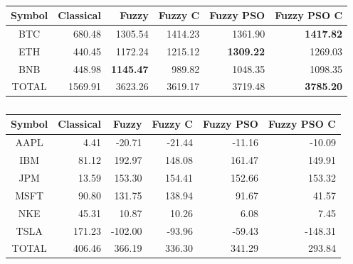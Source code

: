 \begin{table}[]
    \centering
    \begin{tabular}{crrrrr}
        \hline
        \textbf{Symbol} & \textbf{Classical} & \textbf{Fuzzy}                          & \textbf{Fuzzy C} & \textbf{Fuzzy PSO}                      & \textbf{Fuzzy PSO C}                    \\ \hline
        BTC             & 680.48             & 1305.54                                 & 1414.23          & 1361.90                                 & {\color[HTML]{009901} \textbf{1417.82}} \\ \hline
        ETH             & 440.45             & 1172.24                                 & 1215.12          & {\color[HTML]{009901} \textbf{1309.22}} & 1269.03                                 \\ \hline
        BNB             & 448.98             & {\color[HTML]{009901} \textbf{1145.47}} & 989.82           & 1048.35                                 & 1098.35                                 \\ \hline
        TOTAL           & 1569.91            & 3623.26                                 & 3619.17          & 3719.48                                 & {\color[HTML]{009901} \textbf{3785.20}} \\ \hline
    \end{tabular}
    \caption{}
    \label{tab:aroon-macd-crypto}
\end{table}

\begin{table}[]
    \centering
    \begin{tabular}{crrrrr}
        \hline
        \textbf{Symbol} & \textbf{Classical} & \textbf{Fuzzy} & \textbf{Fuzzy C} & \textbf{Fuzzy PSO} & \textbf{Fuzzy PSO C} \\ \hline
        AAPL            & 4.41               & -20.71         & -21.44           & -11.16             & -10.09               \\ \hline
        IBM             & 81.12              & 192.97         & 148.08           & 161.47             & 149.91               \\ \hline
        JPM             & 13.59              & 153.30         & 154.41           & 152.66             & 153.32               \\ \hline
        MSFT            & 90.80              & 131.75         & 138.94           & 91.67              & 41.57                \\ \hline
        NKE             & 45.31              & 10.87          & 10.26            & 6.08               & 7.45                 \\ \hline
        TSLA            & 171.23             & -102.00        & -93.96           & -59.43             & -148.31              \\ \hline
        TOTAL           & 406.46             & 366.19         & 336.30           & 341.29             & 293.84               \\ \hline
    \end{tabular}
    \caption{}
    \label{tab:stocks}
\end{table}


